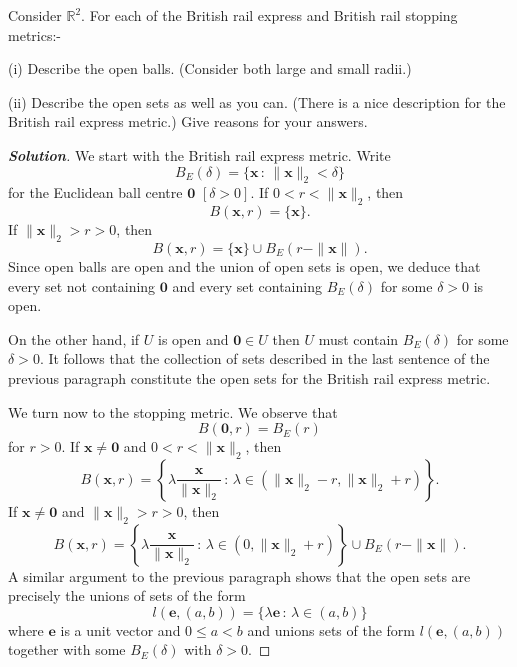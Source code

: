\begin{theorem}\label{T;British rail balls} 
Consider ${\mathbb R}^{2}$.
For each of the British rail express and
British rail stopping metrics:-

(i) Describe the open balls. (Consider both large
and small radii.)

(ii) Describe the open sets as well as you can.
(There is a nice description for the British rail express
metric.) Give reasons for your answers.
\end{theorem}
\begin{proof}[\bf Solution] We start with the British rail express metric.
Write
\[B_{E}(\delta)=\{{\mathbf x}\,:\,\|{\mathbf x}\|_{2}<\delta\}\]
for the Euclidean ball centre ${\boldsymbol 0}$ $[\delta>0]$.
If $0<r<\|{\mathbf x}\|_{2}$, then
\[B({\mathbf x},r)=\{{\mathbf x}\}.\]
If $\|{\mathbf x}\|_{2}>r>0$, then
\[B({\mathbf x},r)=\{{\mathbf x}\}\cup B_{E}(r-\|{\mathbf x}\|).\]
Since open balls are open and the union of open sets is open,
we deduce that every set not containing ${\boldsymbol 0}$ and every
set containing $B_{E}(\delta)$ for some $\delta>0$ is open.

On the other hand, if $U$ is open and ${\mathbf 0}\in U$ then
$U$ must contain $B_{E}(\delta)$ for some $\delta>0$.
It follows that the collection of sets described 
in the last sentence of the previous
paragraph constitute the open sets for the British rail express metric.

We turn now to the stopping metric. We observe that
\[B({\boldsymbol 0},r)=B_{E}(r)\]
for $r>0$. If ${\mathbf x}\neq{\boldsymbol 0}$  and $0<r<\|{\mathbf x}\|_{2}$,
then
\[B({\mathbf x},r)=\left\{\lambda\frac{\mathbf x}{{\|{\mathbf x}\|_{2}}}
\,:\,\lambda\in(\|{\mathbf x}\|_{2}-r,\|{\mathbf x}\|_{2}+r)\right\}.\]
If ${\mathbf x}\neq{\boldsymbol 0}$ and $\|{\mathbf x}\|_{2}>r>0$, then
\[B({\mathbf x},r)=\left\{\lambda\frac{\mathbf x}{{\|{\mathbf x}\|_{2}}}
\,:\,\lambda\in(0,\|{\mathbf x}\|_{2}+r)\right\}
\cup B_{E}(r-\|{\mathbf x}\|).\]
A similar argument to the previous paragraph shows that the open sets are 
precisely the unions of sets of the form
\[l({\mathbf e},(a,b))=\{\lambda{\mathbf e}\,:\,\lambda\in(a,b)\}\]
where ${\mathbf e}$ is a unit vector and $0\leq a<b$ and
unions sets of the form $l({\mathbf e},(a,b))$ together with
some  $B_{E}(\delta)$ with $\delta>0$.
\end{proof}
















